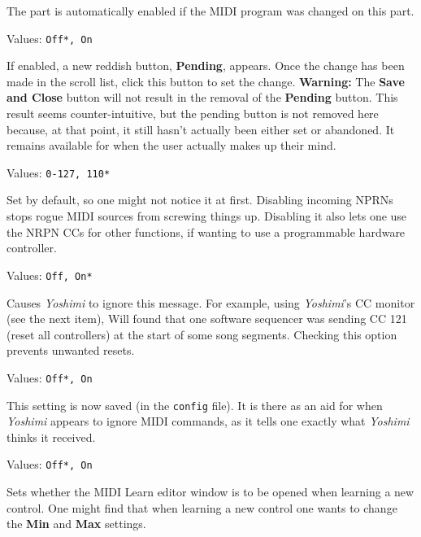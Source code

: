    The part is automatically enabled if the MIDI program was changed on this
   part.


   Values: \texttt{Off*, On}

   If enabled, a new reddish button, \textbf{Pending}, appears.
   Once the change has been made in the scroll list, click this button
   to set the change.
   \textbf{Warning:}
   The \textbf{Save and Close} button will not result in the removal of the
   \textbf{Pending} button.
   This result seems counter-intuitive, but the pending button is not removed
   here because, at that point, it still hasn't actually been either set or
   abandoned. It remains available for when the user actually makes up their
   mind.

   Values: \texttt{0-127, 110*}

   Set by default, so one might not notice it at first.
   Disabling incoming NPRNs stops rogue MIDI sources from screwing things up.
   Disabling it also lets one use the NRPN CCs for other functions,
   if wanting to use a programmable hardware controller.

   Values: \texttt{Off, On*}

   Causes \textsl{Yoshimi} to ignore this message.
   For example, using \textsl{Yoshimi}'s CC monitor (see the next
   item), Will found that one software sequencer was sending CC 121 (reset all
   controllers) at the start of some song segments.  Checking this option
   prevents unwanted resets.

   Values: \texttt{Off*, On}

   This setting is now saved (in the \texttt{config} file). It is there
   as an aid for when \textsl{Yoshimi} appears to ignore MIDI commands,
   as it tells one exactly what \textsl{Yoshimi} thinks it received.

   Values: \texttt{Off*, On}

   Sets whether the MIDI Learn editor window is to be opened when learning a
   new control. One might find that when learning a new control one
   wants to change the \textbf{Min} and \textbf{Max} settings.

